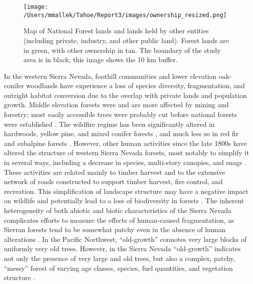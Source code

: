 \begin{figure}[!htbp]
\centering
\texttt{[image: /Users/mmallek/Tahoe/Report3/images/ownership\_resized.png]}
\caption{Map of National Forest lands and lands held by other entities (including private, industry, and other public land). Forest lands are in green, with other ownership in tan. The boundary of the study area is in black; this image shows the 10 km buffer.} 
\label{ownership}
\end{figure}

In the western Sierra Nevada, foothill communities and lower elevation oak-conifer woodlands have experience a loss of species diversity, fragmentation, and outright habitat conversion due to the overlap with private lands and population growth. Middle elevation forests were and are more affected by mining and forestry; most easily accessible trees were probably cut before national forests were established \citep{SNEP1996}. The wildfire regime has been significantly altered in hardwoods, yellow pine, and mixed conifer forests \citep{Merriam2013,Safford2013}, and much less so in red fir and subalpine forests \citep{Meyer2013,Meyer2013a}. However, other human activities since the late 1800s have altered the structure of western Sierra Nevada forests, most notably to simplify it in several ways, including a decrease in species, multi-story canopies, and snags \citep{SNEP1996}. These activities are related mainly to timber harvest and to the extensive network of roads constructed to support timber harvest, fire control, and recreation. This simplification of landscape structure may have a negative impact on wildlife and potentially lead to a loss of biodiversity in forests \citep{Thompson2003,Manley2004,Hunter2011}. The inherent heterogeneity of both abiotic and biotic characteristics of the Sierra Nevada complicates efforts to measure the effects of human-caused fragmentation, as Sierran forests tend to be somewhat patchy even in the absence of human alterations \citep{Franklin1996}. In the Pacific Northwest, ``old-growth'' connotes very large blocks of uniformly very old trees. However, in the Sierra Nevada ``old-growth'' indicates not only the presence of very large and old trees, but also a complex, patchy, ``messy'' forest of varying age classes, species, fuel quantities, and vegetation structure \citep{SNEP1996}.

